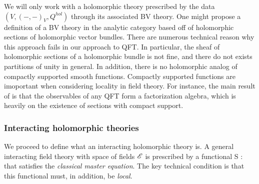 \documentclass[10pt]{amsart}
\def\brian{\textcolor{blue}{BW: }\textcolor{blue}}
\begin{document}

\begin{rmk} \label{rmk: hol sec bad}
We will only work with a holomorphic theory prescribed by the data $(V, (-,-)_V, Q^{hol})$ through its associated BV theory.
One might propose a definition of a BV theory in the analytic category based off of holomorphic sections of holomorphic vector bundles. 
There are numerous technical reason why this approach fails in our approach to QFT.
In particular, the sheaf of holomorphic sections of a holomorphic bundle is not fine, and there do not exists partitions of unity in general. 
In addition, there is no holomorphic analog of compactly supported smooth functions. 
Compactly supported functions are imoportant when considering locality in field theory. 
For instance, the main result of \cite{CG2} is that the observables of any QFT form a factorization algebra, which is heavily on the existence of sections with compact support. 
\end{rmk}

\subsubsection{Interacting holomorphic theories} \label{sec: interacting}

\def\olochol{\sO_{\rm loc}^{hol}}

We proceed to define what an interacting holomorphic theory is.
A general interacting field theory with space of fields $\mathscr E$ is prescribed by a functional
\ben
S : \sE \to \CC
\een
that satisfies the {\em classical master equation}.
The key technical condition is that this functional must, in addition, be {\em local}.



\end{document}
